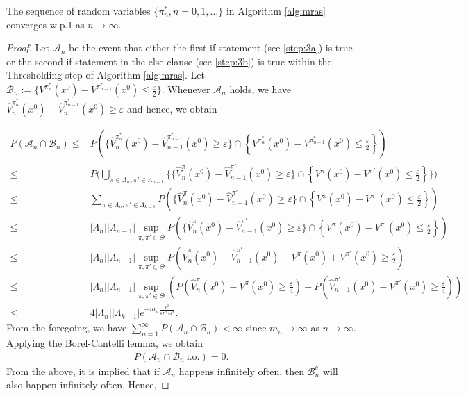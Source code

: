 \begin{lemma}\label{lemma:iofo}
    The sequence of random variables $\{\pi^*_n,n=0,1,\ldots \}$ in Algorithm \ref{alg:mras} converges w.p.1 as $n\rightarrow \infty$.
\end{lemma}
\begin{proof}
    Let $\mathcal{A}_n$ be the event that either the first if statement (see \ref{step:3a}) is true or the second if statement in the else clause (see \ref{step:3b}) is true within the Thresholding step of Algorithm \ref{alg:mras}. Let $\mathcal{B}_n:=\{V^{\pi^*_{n}}(x^0)-V^{\pi^*_{n-1}}(x^0)\leq \frac{\varepsilon}{2}\}$.
    Whenever $\mathcal{A}_n$ holds, we have $\widehat V_n^{\pi^*_{n}}(x^0)-\widehat V_n^{\pi^*_{n-1}}(x^0)\geq \varepsilon$ and hence, we obtain

\begin{align*}
P(\mathcal{A}_{n}\cap \mathcal{B}_n) \leq &
P 
\left(\big\{\widehat V_n^{\pi^*_{n}}(x^0)-\widehat V_{n-1}^{\pi^*_{n-1}}(x^0)\geq \varepsilon\big\} \cap \left\{V^{\pi^*_{n}}(x^0)-V^{\pi^*_{n-1}}(x^0)\leq \frac{\varepsilon}{2}\right\}\right)\\
 \leq &
P\Big(\bigcup_{\pi\in\Lambda_n, \pi'\in \Lambda_{n-1}} \Big\{\big\{\widehat V_n^{\pi}(x^0)-\widehat V_{n-1}^{\pi'}(x^0)\geq \varepsilon\big\} \cap \left\{V^\pi(x^0)-V^{\pi'}(x^0)\leq \frac{\varepsilon}{2}\right\} \Big\}\Big)\\
\leq & \sum_{{\pi\in \Lambda_n},{\pi'\in \Lambda_{k-1}}}P\left(\big\{\widehat V_n^{\pi}(x^0)-\widehat V_{n-1}^{\pi'}(x^0)\geq \varepsilon\big\} \cap
\left\{V^\pi(x^0)-V^{\pi'}(x^0)\leq \frac{\varepsilon}{2}\right\}\right) \\
\leq & |\Lambda_n||\Lambda_{n-1}|\sup_{\pi,\pi'\in \Theta}P\left(\big\{\widehat V_n^{\pi}(x^0)-\widehat V_{n-1}^{\pi'}(x^0)\geq \varepsilon\big\} \cap
\left\{V^\pi(x^0)-V^{\pi'}(x^0)\leq \frac{\varepsilon}{2}\right\} \right) \\
\leq &|\Lambda_n||\Lambda_{n-1}|\sup_{\pi,\pi'\in \Theta}P\left(\widehat V_n^{\pi}(x^0)-\widehat V_{n-1}^{\pi'}(x^0)-V^\pi(x^0)+V^{\pi'}(x^0)\geq \frac{\varepsilon}{2}\right) \\
\leq &|\Lambda_n||\Lambda_{n-1}|\sup_{\pi,\pi'\in \Theta}\left(P\left(\widehat V_n^{\pi}(x^0)-V^\pi(x^0)\geq \frac{\varepsilon}{4}\right) + P\left(\widehat V_{n-1}^{\pi'}(x^0)-V^{\pi'}(x^0)\geq \frac{\varepsilon}{4}\right)\right) \\
\leq & 4|\Lambda_n||\Lambda_{k-1}|
 e^{-m_n \frac{\epsilon^2}{8 L^2 M^2}}.
\end{align*}
From the foregoing, we have $\sum_{n=1}^{\infty}P\left(\mathcal{A}_n \cap \mathcal{B}_n\right) < \infty$ since $m_n \rightarrow \infty$ as $n\rightarrow \infty$.  Applying the Borel-Cantelli lemma, we obtain
\begin{align*}
P\left(\mathcal{A}_n \cap \mathcal{B}_n~\mbox{i.o.} \right)=0.
\end{align*}
From the above, it is implied that if $\mathcal{A}_n$ happens infinitely often,
then $\mathcal{B}_n^c$ will also happen infinitely often. Hence,


\end{proof}
